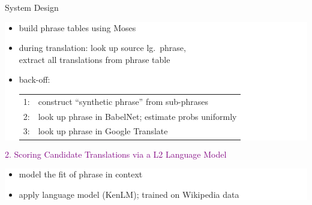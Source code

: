 \documentclass[final,t]{beamer}
\begin{document}
\begin{frame}{}
\begin{columns}[t]
\begin{column}{.47\linewidth}
\begin{block}{System Design}
 \colorbox{white}{
\begin{minipage}{.90\linewidth}
 \begin{itemize}
  \item build phrase tables using Moses
  \item during translation: look up source lg.\ phrase, \\
    \mbox{}\hspace{8em}extract all translations from phrase table\\[1ex]
  \item back-off: \begin{tabular}{cl}
       1: & construct ``synthetic phrase'' from sub-phrases\\
       2: & look up phrase in BabelNet; estimate probs uniformly\\
       3: & look up phrase in Google Translate\\
     \end{tabular}
  \end{itemize}
\end{minipage}
}
\vspace{1cm}


\begin{center}
  \textcolor{purple}{2. Scoring Candidate Translations via a L2 Language Model}
\end{center}
 
  \colorbox{white}{
\begin{minipage}{.90\linewidth}
 \begin{itemize}
  \item model the fit of phrase in context
  \item apply language model (KenLM); trained on Wikipedia data
  \end{itemize}
\end{minipage}
}
\vspace{1cm}





\end{block}
\end{column}
\end{columns}
\end{frame}
\end{document}
